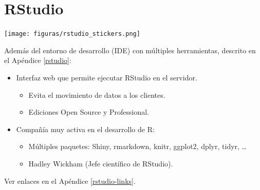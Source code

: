\documentclass[
]{book}
\theoremstyle{break}
\begin{document}
\hypertarget{rstudio-com}{%
\section{RStudio}\label{rstudio-com}}

\texttt{[image: figuras/rstudio\_stickers.png]}

Además del entorno de desarrollo (IDE) con múltiples herramientas,
descrito en el Apéndice \ref{rstudio}:

\begin{itemize}
\item
  Interfaz web que permite ejecutar RStudio en el servidor.

  \begin{itemize}
  \item
    Evita el movimiento de datos a los clientes.
  \item
    Ediciones Open Source y Professional.
  \end{itemize}
\item
  Compañía muy activa en el desarrollo de R:

  \begin{itemize}
  \item
    Múltiples paquetes: Shiny, rmarkdown, knitr, ggplot2, dplyr, tidyr, \ldots{}
  \item
    Hadley Wickham (Jefe científico de RStudio).
  \end{itemize}
\end{itemize}

Ver enlaces en el Apéndice \ref{rstudio-links}.

  
\end{document}
